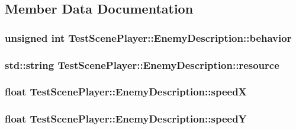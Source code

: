 \subsection{Member Data Documentation}
\hypertarget{struct_test_scene_player_1_1_enemy_description_a10d3b47395f41d22dac6cba49dc6db1a}{
\subsubsection[{behavior}]{\setlength{\rightskip}{0pt plus 5cm}unsigned int {\bf TestScenePlayer::EnemyDescription::behavior}}}
\label{d5/d29/struct_test_scene_player_1_1_enemy_description_a10d3b47395f41d22dac6cba49dc6db1a}
\hypertarget{struct_test_scene_player_1_1_enemy_description_a6e3fde335eb4b075b76f89a346750672}{
\subsubsection[{resource}]{\setlength{\rightskip}{0pt plus 5cm}std::string {\bf TestScenePlayer::EnemyDescription::resource}}}
\label{d5/d29/struct_test_scene_player_1_1_enemy_description_a6e3fde335eb4b075b76f89a346750672}
\hypertarget{struct_test_scene_player_1_1_enemy_description_ad64d61ce1d12f2682d25c165396799e4}{
\subsubsection[{speedX}]{\setlength{\rightskip}{0pt plus 5cm}float {\bf TestScenePlayer::EnemyDescription::speedX}}}
\label{d5/d29/struct_test_scene_player_1_1_enemy_description_ad64d61ce1d12f2682d25c165396799e4}
\hypertarget{struct_test_scene_player_1_1_enemy_description_ae6c3245759b23c3dacf4188c233ef57c}{
\subsubsection[{speedY}]{\setlength{\rightskip}{0pt plus 5cm}float {\bf TestScenePlayer::EnemyDescription::speedY}}}
